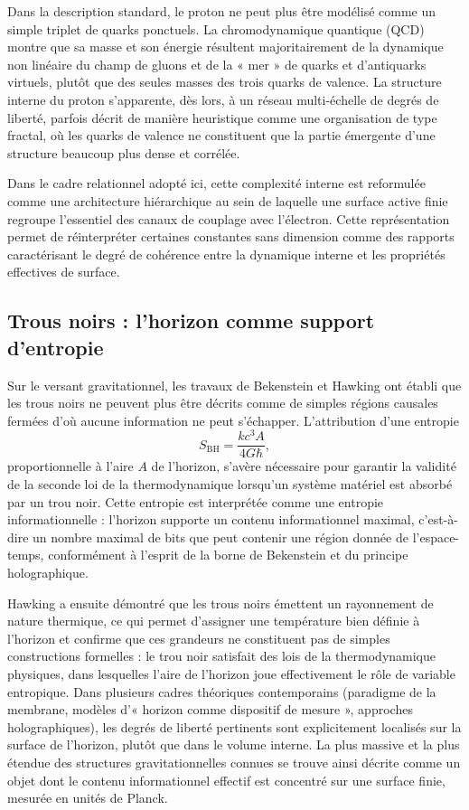 \documentclass[11pt,a4paper]{article}
\begin{document}
Dans la description standard, le proton ne peut plus être modélisé comme un simple triplet de quarks ponctuels. La chromodynamique quantique (QCD) montre que sa masse et son énergie résultent majoritairement de la dynamique non linéaire du champ de gluons et de la « mer » de quarks et d’antiquarks virtuels, plutôt que des seules masses des trois quarks de valence. La structure interne du proton s’apparente, dès lors, à un réseau multi-échelle de degrés de liberté, parfois décrit de manière heuristique comme une organisation de type fractal, où les quarks de valence ne constituent que la partie émergente d’une structure beaucoup plus dense et corrélée.

Dans le cadre relationnel adopté ici, cette complexité interne est reformulée comme une architecture hiérarchique au sein de laquelle une surface active finie regroupe l’essentiel des canaux de couplage avec l’électron. Cette représentation permet de réinterpréter certaines constantes sans dimension comme des rapports caractérisant le degré de cohérence entre la dynamique interne et les propriétés effectives de surface.

\subsection{Trous noirs : l’horizon comme support d’entropie}

Sur le versant gravitationnel, les travaux de Bekenstein et Hawking ont établi que les trous noirs ne peuvent plus être décrits comme de simples régions causales fermées d’où aucune information ne peut s’échapper. L’attribution d’une entropie
\[
S_{\mathrm{BH}} = \frac{k c^{3} A}{4 G \hbar},
\]
proportionnelle à l’aire \(A\) de l’horizon, s’avère nécessaire pour garantir la validité de la seconde loi de la thermodynamique lorsqu’un système matériel est absorbé par un trou noir. Cette entropie est interprétée comme une entropie informationnelle : l’horizon supporte un contenu informationnel maximal, c’est-à-dire un nombre maximal de bits que peut contenir une région donnée de l’espace-temps, conformément à l’esprit de la borne de Bekenstein et du principe holographique.

Hawking a ensuite démontré que les trous noirs émettent un rayonnement de nature thermique, ce qui permet d’assigner une température bien définie à l’horizon et confirme que ces grandeurs ne constituent pas de simples constructions formelles : le trou noir satisfait des lois de la thermodynamique physiques, dans lesquelles l’aire de l’horizon joue effectivement le rôle de variable entropique. Dans plusieurs cadres théoriques contemporains (paradigme de la membrane, modèles d’« horizon comme dispositif de mesure », approches holographiques), les degrés de liberté pertinents sont explicitement localisés sur la surface de l’horizon, plutôt que dans le volume interne. La plus massive et la plus étendue des structures gravitationnelles connues se trouve ainsi décrite comme un objet dont le contenu informationnel effectif est concentré sur une surface finie, mesurée en unités de Planck.
\end{document}
